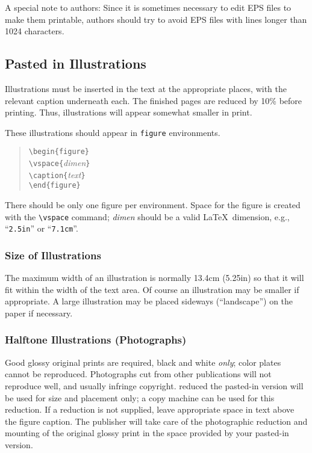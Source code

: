 \documentclass[11pt,twoside]{article}
\def\emphasize#1{{\sl#1\/}}
\def\arg#1{{\it#1\/}}
\def\edcomment#1{\iffalse\marginpar{\raggedright\sl#1\/}\else\relax\fi}
\begin{document}
A special note to authors:  
Since it is sometimes necessary to edit EPS files to make them 
printable, authors should try to avoid EPS files with lines longer than
1024 characters.

\subsection{Pasted in Illustrations}

Illustrations must be inserted in the text at the appropriate places, with
the relevant caption underneath each.  The finished pages are reduced by
10\% before printing.  Thus, illustrations will appear somewhat smaller
in print.

These illustrations should appear in {\tt figure} environments.
\begin{quote}
\verb+\begin{figure}+\\
\verb+\vspace{+\arg{dimen}\verb+}+\\
\verb+\caption{+\arg{text}\verb+}+\\
\verb+\end{figure}+
\end{quote}
There should be only one figure per environment.
Space for the figure is created with the \verb+\vspace+ command;
\arg{dimen} should be a valid \LaTeX\ dimension, e.g., ``\verb+2.5in+''
or ``\verb+7.1cm+''.

\edcomment{EPS takes care of all this.}

\subsubsection{Size of Illustrations}

The maximum width of an illustration is normally 13.4cm (5.25in)
so that it will fit within the width of the text area.  Of course an
illustration may be smaller if appropriate.  A large illustration may
be placed sideways (``landscape'') on the paper if necessary.

\subsubsection{Halftone Illustrations (Photographs)}

Good glossy original prints are required, black and white
\emphasize{only}; color plates cannot be reproduced.  Photographs cut
from other publications will not reproduce well, and usually infringe
copyright.  %
reduced %
the %
pasted-in version will
be used for size and placement only; a copy machine can be used for
this reduction.  If a reduction is not supplied, leave appropriate space
in text above the figure caption.  The publisher will take care of the
photographic reduction and mounting of the original glossy print in the
space provided by your pasted-in version.
\end{document}
